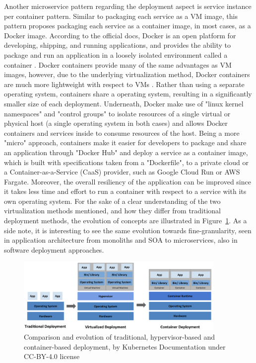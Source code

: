 \documentclass{Configuration_Files/PoliMi3i_thesis}
\begin{document}
Another microservice pattern regarding the deployment aspect is service instance per container pattern.
Similar to packaging each service as a VM image, this pattern proposes packaging each service as a container image, in most cases, as a Docker image.
According to the official docs, Docker is an open platform for developing, shipping, and running applications, and provides the ability to package and run an application in a loosely isolated environment called a container \cite{docker_def}.
Docker containers provide many of the same advantages as VM images, however, due to the underlying virtualization method, Docker containers are much more lightweight with respect to VMs \cite{eder2016hypervisor}.
Rather than using a separate operating system, containers share a operating system, resulting in a significantly smaller size of each deployment.
Underneath, Docker make use of "linux kernel namespaces" and "control groups" to isolate resources of a single virtual or physical host (a single operating system in both cases) and allows Docker containers and services inside to consume resources of the host.
Being a more "micro" approach, containers make it easier for developers to package and share an application through "Docker Hub" and deploy a service as a container image, which is built with specifications taken from a "Dockerfile", to a private cloud or a Container-as-a-Service (CaaS) provider, such as Google Cloud Run or AWS Fargate.
Moreover, the overall resiliency of the application can be improved since it takes less time and effort to run a container with respect to a service with its own operating system.
For the sake of a clear understanding of the two virtualization methods mentioned, and how they differ from traditional deployment methods, the evolution of concepts are illustrated in Figure~\ref{fig:hypervisor_vs_container}. As a side note, it is interesting to see the same evolution towards fine-granularity, seen in application architecture from monoliths and SOA to microservices, also in software deployment approaches.

\begin{figure}[H]
\centering
\includegraphics[width=0.90\textwidth]{myImages/kubernetes_evo.png}
\caption{Comparison and evolution of traditional, hypervisor-based and container-based deployment, by Kubernetes Documentation under CC-BY-4.0 license}
\label{fig:hypervisor_vs_container}
\end{figure}
\end{document}
